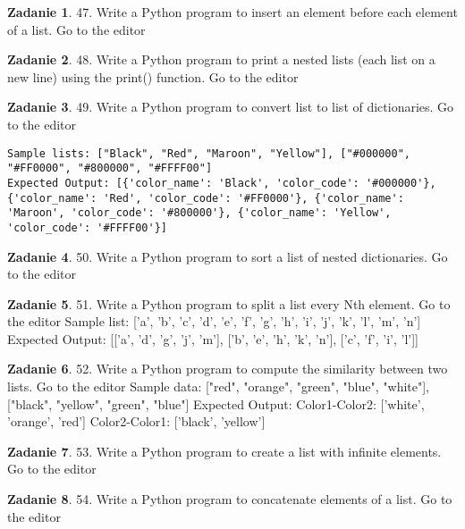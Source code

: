 \documentclass[11pt]{article}
\theoremstyle{definition}
\newtheorem{zadanie}{Zadanie}
\begin{document}
\begin{zadanie}
47. Write a Python program to insert an element before each element of a list. Go to the editor
\end{zadanie}

\begin{zadanie}
48. Write a Python program to print a nested lists (each list on a new line) using the print() function. Go to the editor
\end{zadanie}

\begin{zadanie}
49. Write a Python program to convert list to list of dictionaries. Go to the editor
\begin{verbatim}
Sample lists: ["Black", "Red", "Maroon", "Yellow"], ["#000000", "#FF0000", "#800000", "#FFFF00"]
Expected Output: [{'color_name': 'Black', 'color_code': '#000000'}, {'color_name': 'Red', 'color_code': '#FF0000'}, {'color_name': 'Maroon', 'color_code': '#800000'}, {'color_name': 'Yellow', 'color_code': '#FFFF00'}]
\end{verbatim}
\end{zadanie}

\begin{zadanie}
50. Write a Python program to sort a list of nested dictionaries. Go to the editor
\end{zadanie}

\begin{zadanie}
51. Write a Python program to split a list every Nth element. Go to the editor
Sample list: ['a', 'b', 'c', 'd', 'e', 'f', 'g', 'h', 'i', 'j', 'k', 'l', 'm', 'n']
Expected Output: [['a', 'd', 'g', 'j', 'm'], ['b', 'e', 'h', 'k', 'n'], ['c', 'f', 'i', 'l']]
\end{zadanie}

\begin{zadanie}
52. Write a Python program to compute the similarity between two lists. Go to the editor
Sample data: ["red", "orange", "green", "blue", "white"], ["black", "yellow", "green", "blue"]
Expected Output:
Color1-Color2: ['white', 'orange', 'red']
Color2-Color1: ['black', 'yellow']
\end{zadanie}

\begin{zadanie}
53. Write a Python program to create a list with infinite elements. Go to the editor
\end{zadanie}

\begin{zadanie}
54. Write a Python program to concatenate elements of a list. Go to the editor
\end{zadanie}
\end{document}
